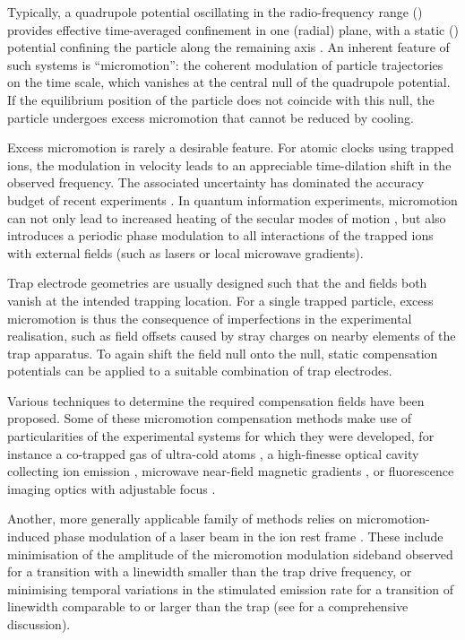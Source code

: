 \documentclass[pra,twocolumn]{revtex4-2}
\begin{document}
Typically, a quadrupole potential oscillating in the radio-frequency range (\RF{}) provides effective time-averaged confinement in one (radial) plane, with a static (\DC{}) potential confining the particle along the remaining axis \cite{Leibfried2003}.
An inherent feature of such systems is \enquote{micromotion}: the coherent modulation of particle trajectories on the \RF{} time scale, which vanishes at the central null of the quadrupole potential.
If the equilibrium position of the particle does not coincide with this null, the particle undergoes excess micromotion that cannot be reduced by cooling.

Excess micromotion is rarely a desirable feature.
For atomic clocks using trapped ions, the modulation in velocity leads to an appreciable time-dilation shift in the observed frequency.
The associated uncertainty has dominated the accuracy budget of recent experiments \cite{brewerQuantumLogicClockSystematic2019}.
In quantum information experiments, micromotion can not only lead to increased heating of the secular modes of motion \cite{brouardHeatingTrappedIon2001}, but also introduces a periodic phase modulation to all interactions of the trapped ions with external fields (such as lasers or local microwave gradients).

Trap electrode geometries are usually designed such that the \RF{} and \DC{} fields both vanish at the intended trapping location.
For a single trapped particle, excess micromotion is thus the consequence of imperfections in the experimental realisation, such as \DC{} field offsets caused by stray charges on nearby elements of the trap apparatus.
To again shift the \DC{} field null onto the \RF{} null, static compensation potentials can be applied to a suitable combination of trap electrodes.

Various techniques to determine the required compensation fields have been proposed.
Some of these micromotion compensation methods make use of particularities of the experimental systems for which they were developed, for instance a co-trapped gas of ultra-cold atoms \cite{harterMinimizationIonMicromotion2013,meirDynamicsGroundStateCooled2016}, a high-finesse optical cavity collecting ion emission \cite{chuahDetectionIonMicromotion2013}, microwave near-field magnetic gradients \cite{warringTechniquesMicrowaveNearfield2013}, or fluorescence imaging optics with adjustable focus \cite{glogerIontrajectoryAnalysisMicromotion2015}.

Another, more generally applicable family of methods relies on micromotion-induced phase modulation of a laser beam in the ion rest frame \cite{berkelandMinimizationIonMicromotion1998}.
These include minimisation of the amplitude of the micromotion modulation sideband observed for a transition with a linewidth smaller than the trap drive frequency, or minimising temporal variations in the stimulated emission rate for a transition of linewidth comparable to or larger than the trap \RF{} (see  for a comprehensive discussion).
\end{document}
